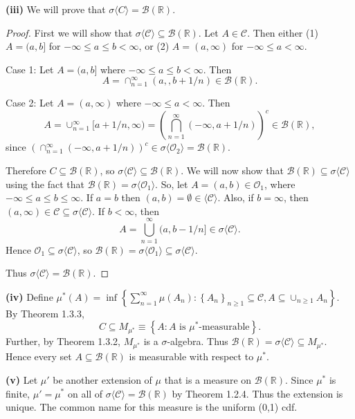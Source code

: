 \documentclass[12pt]{article}
\begin{document}
{\bf (iii)} We will prove that $\sigma\langle C\rangle = \mathcal{B}(\mathbb{R})$.

\begin{proof}
First we will show that $\sigma \langle \mathcal{C}\rangle \subseteq \mathcal{B}(\mathbb{R})$. Let $A \in \mathcal{C}$. Then either (1) $A = (a,b]$ for $-\infty \leq a \leq b < \infty$, or (2) $A = (a, \infty)$ for $-\infty \leq a < \infty$.

Case 1: Let $A = (a,b]$ where $-\infty \leq a \leq b < \infty$. Then 
\[ A = \cap_{n=1}^{\infty}(a, ,b + 1/n) \in \mathcal{B}(\mathbb{R}). \]

Case 2: Let $A = (a, \infty)$ where $-\infty \leq a < \infty$. Then 
\[ A = \cup_{n=1}^{\infty}[a + 1/n, \infty) = \left( \bigcap_{n=1}^{\infty}(-\infty, a + 1/n) \right)^{c} \in \mathcal{B}(\mathbb{R}), \]
since $\left( \cap_{n=1}^{\infty}(-\infty, a + 1/n) \right)^{c} \in \sigma\langle \mathcal{O}_{2}\rangle = \mathcal{B}(\mathbb{R})$.

Therefore $C \subseteq \mathcal{B}(\mathbb{R})$, so $\sigma\langle \mathcal{C}\rangle \subseteq \mathcal{B}(\mathbb{R})$. We will now show that
$\mathcal{B}(\mathbb{R}) \subseteq \sigma \langle \mathcal{C}\rangle$ using the fact that $\mathcal{B}(\mathbb{R}) = \sigma \langle
\mathcal{O}_{1}\rangle$. So, let $A = (a,b) \in \mathcal{O}_{1}$, where $-\infty \leq a \leq b \leq \infty$. If $a = b$ then $(a,b) = \emptyset \in
\langle \mathcal{C} \rangle$. Also, if $b = \infty$, then $(a, \infty) \in \mathcal{C} \subseteq \sigma \langle \mathcal{C}\rangle$. If $b < \infty$,
then 
\[ A = \bigcup_{n=1}^{\infty}(a, b - 1/n] \in \sigma \langle \mathcal{C}\rangle. \]
Hence $\mathcal{O}_{1} \subseteq \sigma \langle \mathcal{C}\rangle$, so $\mathcal{B}(\mathbb{R}) = \sigma\langle \mathcal{O}_{1}\rangle \subseteq
\sigma\langle \mathcal{C} \rangle$.

Thus $\sigma\langle \mathcal{C} \rangle = \mathcal{B}(\mathbb{R})$.
\end{proof}

{\bf (iv)} Define $\mu^{*}(A) = \inf\left\{ \sum_{n=1}^{\infty}\mu(A_{n}) : \left\{ A_{n} \right\}_{n\geq 1}\subseteq \mathcal{C}, A \subseteq
\cup_{n\geq 1}A_{n} \right\}$. By Theorem 1.3.3,
\[ C \subseteq M_{\mu^{*}} \equiv \left\{ A : A \text{ is $\mu^{*}$-measurable} \right\}. \]
Further, by Theorem 1.3.2, $M_{\mu^{*}}$ is a $\sigma$-algebra. Thus $\mathcal{B}(\mathbb{R}) = \sigma\langle\mathcal{C}\rangle \subseteq
M_{\mu^{*}}$. Hence every set $A \subseteq \mathcal{B}(\mathbb{R})$ is measurable with respect to $\mu^{*}$.

{\bf (v)} Let $\mu'$ be another extension of $\mu$ that is a measure on $\mathcal{B}(\mathbb{R})$. Since $\mu^{*}$ is finite, 
$\mu' = \mu^{*}$ on all of $\sigma\langle\mathcal{C}\rangle = \mathcal{B}(\mathbb{R})$ by Theorem 1.2.4. Thus the extension is unique.
The common name for this measure is the uniform (0,1) cdf.
\end{document}

